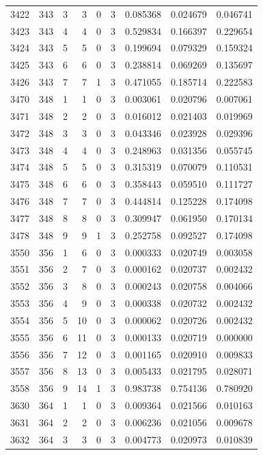 \begin{longtable}{rrrrrrrrr}
3422 & 343 & 3 & 3 & 0 & 3 & 0.085368 & 0.024679 & 0.046741 \\
3423 & 343 & 4 & 4 & 0 & 3 & 0.529834 & 0.166397 & 0.229654 \\
3424 & 343 & 5 & 5 & 0 & 3 & 0.199694 & 0.079329 & 0.159324 \\
3425 & 343 & 6 & 6 & 0 & 3 & 0.238814 & 0.069269 & 0.135697 \\
3426 & 343 & 7 & 7 & 1 & 3 & 0.471055 & 0.185714 & 0.222583 \\
3470 & 348 & 1 & 1 & 0 & 3 & 0.003061 & 0.020796 & 0.007061 \\
3471 & 348 & 2 & 2 & 0 & 3 & 0.016012 & 0.021403 & 0.019969 \\
3472 & 348 & 3 & 3 & 0 & 3 & 0.043346 & 0.023928 & 0.029396 \\
3473 & 348 & 4 & 4 & 0 & 3 & 0.248963 & 0.031356 & 0.055745 \\
3474 & 348 & 5 & 5 & 0 & 3 & 0.315319 & 0.070079 & 0.110531 \\
3475 & 348 & 6 & 6 & 0 & 3 & 0.358443 & 0.059510 & 0.111727 \\
3476 & 348 & 7 & 7 & 0 & 3 & 0.444814 & 0.125228 & 0.174098 \\
3477 & 348 & 8 & 8 & 0 & 3 & 0.309947 & 0.061950 & 0.170134 \\
3478 & 348 & 9 & 9 & 1 & 3 & 0.252758 & 0.092527 & 0.174098 \\
3550 & 356 & 1 & 6 & 0 & 3 & 0.000333 & 0.020749 & 0.003058 \\
3551 & 356 & 2 & 7 & 0 & 3 & 0.000162 & 0.020737 & 0.002432 \\
3552 & 356 & 3 & 8 & 0 & 3 & 0.000243 & 0.020758 & 0.004066 \\
3553 & 356 & 4 & 9 & 0 & 3 & 0.000338 & 0.020732 & 0.002432 \\
3554 & 356 & 5 & 10 & 0 & 3 & 0.000062 & 0.020726 & 0.002432 \\
3555 & 356 & 6 & 11 & 0 & 3 & 0.000133 & 0.020719 & 0.000000 \\
3556 & 356 & 7 & 12 & 0 & 3 & 0.001165 & 0.020910 & 0.009833 \\
3557 & 356 & 8 & 13 & 0 & 3 & 0.005433 & 0.021795 & 0.028071 \\
3558 & 356 & 9 & 14 & 1 & 3 & 0.983738 & 0.754136 & 0.780920 \\
3630 & 364 & 1 & 1 & 0 & 3 & 0.009364 & 0.021566 & 0.010163 \\
3631 & 364 & 2 & 2 & 0 & 3 & 0.006236 & 0.021056 & 0.009678 \\
3632 & 364 & 3 & 3 & 0 & 3 & 0.004773 & 0.020973 & 0.010839 \\

\end{longtable}
